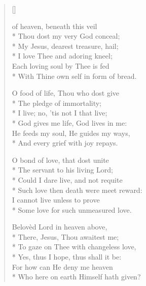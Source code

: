 \newHymn


\begin{verse}[\versewidth]

\begin{patverse}
 of heaven, beneath this veil  \\*   
 Thou dost my very God conceal;\\*
 My Jesus, dearest treasure, hail;\\*
 I love Thee and adoring kneel;     \\
 Each loving soul by Thee is fed      \\*  
 With Thine own self in form of bread.  
\end{patverse}

\begin{patverse}
O food of life, Thou who dost give  \\*
 The pledge of immortality;             \\*
 I live; no,  'tis not I that live;      \\*
 God gives me life, God lives in me:    \\
 He feeds my soul, He guides my ways,   \\*
 And every grief with joy repays.       
\end{patverse}

\begin{patverse}
O bond of love, that dost unite     \\*
 The servant to his living Lord;        \\*
 Could I dare live, and not requite     \\*
 Such love then death were meet reward: \\
 I cannot live unless to prove          \\*
 Some love for such unmeasured love.    
\end{patverse}

\begin{patverse}
 Belovèd Lord in heaven above,       \\*
 There, Jesus, Thou awaitest me;        \\*
 To gaze on Thee with changeless love,  \\*
 Yes, thus I hope, thus shall it be:    \\
 For how can He deny me heaven          \\*
 Who here on earth Himself hath given?  
\end{patverse}
 
 \end{verse}
                                        


